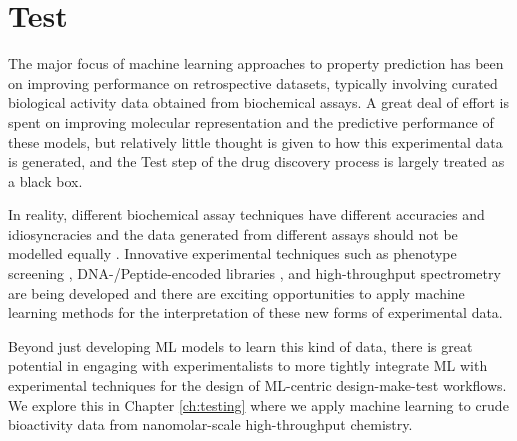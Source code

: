 \section*{Test}
The major focus of machine learning approaches to property prediction has been on improving performance on retrospective datasets, typically involving curated biological activity data obtained from biochemical assays. A great deal of effort is spent on improving molecular representation and the predictive performance of these models, but relatively little thought is given to how this experimental data is generated, and the Test step of the drug discovery process is largely treated as a black box. 

In reality, different biochemical assay techniques have different accuracies and idiosyncracies and the data generated from different assays should not be modelled equally \cite{Hughes2011Principles}. Innovative experimental techniques such as phenotype screening \cite{Chandrasekaran2021Phenotype}, DNA-/Peptide-encoded libraries \cite{GirondaMartinez2021DNALibrary, Rossler2023PeptideLibrary}, and high-throughput spectrometry \cite{Dunas2023MassSpec} are being developed and there are exciting opportunities to apply machine learning methods for the interpretation of these new forms of experimental data.

Beyond just developing ML models to learn this kind of data, there is great potential in engaging with experimentalists to more tightly integrate ML with experimental techniques for the design of ML-centric design-make-test workflows. We explore this in Chapter \ref{ch:testing} where we apply machine learning to crude bioactivity data from nanomolar-scale high-throughput chemistry.
